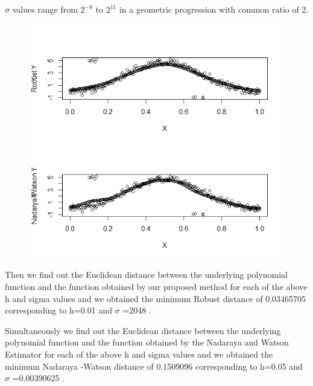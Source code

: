 \documentclass[11pt]{article}
\begin{document}
\begin{flushleft}
 $\sigma$ values range from $2^{-8}$ to $2 ^{11}$ in a geometric progression with common ratio of 2.




\vspace{0.1in}

\begin{figure}[ht]
\begin{center}
\includegraphics[scale=0.8]{Rplot}

\end{center}
\end{figure}

Then we find out the Euclidean distance between the underlying polynomial function and the function obtained by our proposed method for each of the above h and sigma values and we obtained the minimum Robust distance of  0.03465705 corresponding to h=0.01 and $\sigma$ =2048 .

\vspace{0.1in}

Simultaneously we find out the Euclidean distance between the underlying polynomial function and the function obtained by the Nadaraya and Watson Estimator for each of the above h and sigma values and we obtained the minimum Nadaraya -Watson distance of  0.1509096 corresponding to h=0.05 and $\sigma$ =0.00390625 .



\end{flushleft}
\end{document}
